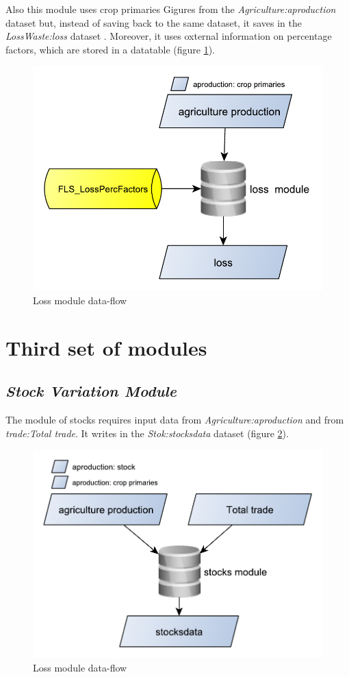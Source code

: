 \documentclass[]{article}
\begin{document}
Also this module uses crop primaries Gigures from the
\emph{Agriculture:aproduction} dataset but, instead of saving back to
the same dataset, it saves in the \emph{LossWaste:loss} dataset .
Moreover, it uses oxternal information on percentage factors, which are
stored in a datatable (figure \ref{fig:f12}).

\begin{figure}[H]

{\centering \includegraphics[width=0.45\linewidth]{images/SwsFbs/12_loss} 

}

\caption{\label{fig:f12}Loss module data-flow}\label{fig:f12}
\end{figure}

\section{Third set of modules}\label{third-set-of-modules}

\subsection{\texorpdfstring{\emph{Stock Variation
Module}}{Stock Variation Module}}\label{stock-variation-module}

The module of stocks requires input data from
\emph{Agriculture:aproduction} and from \emph{trade:Total trade}. It
writes in the \emph{Stok:stocksdata} dataset (figure \ref{fig:f13}).

\begin{figure}[H]

{\centering \includegraphics[width=0.45\linewidth]{images/SwsFbs/13_stock} 

}

\caption{\label{fig:f13}Loss module data-flow}\label{fig:f13}
\end{figure}
\end{document}
